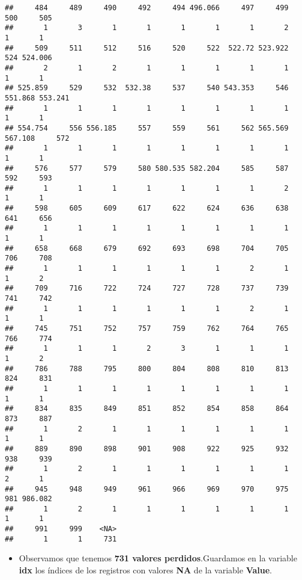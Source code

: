 \documentclass[]{article}
\providecommand{\tightlist}{%
  \setlength{\itemsep}{0pt}\setlength{\parskip}{0pt}}
\begin{document}
\begin{verbatim}
##     484     489     490     492     494 496.066     497     499     500     505 
##       1       3       1       1       1       1       1       2       1       1 
##     509     511     512     516     520     522  522.72 523.922     524 524.006 
##       2       1       2       1       1       1       1       1       1       1 
## 525.859     529     532  532.38     537     540 543.353     546 551.868 553.241 
##       1       1       1       1       1       1       1       1       1       1 
## 554.754     556 556.185     557     559     561     562 565.569 567.108     572 
##       1       1       1       1       1       1       1       1       1       1 
##     576     577     579     580 580.535 582.204     585     587     592     593 
##       1       1       1       1       1       1       1       2       1       1 
##     598     605     609     617     622     624     636     638     641     656 
##       1       1       1       1       1       1       1       1       1       1 
##     658     668     679     692     693     698     704     705     706     708 
##       1       1       1       1       1       1       2       1       1       2 
##     709     716     722     724     727     728     737     739     741     742 
##       1       1       1       1       1       1       2       1       1       1 
##     745     751     752     757     759     762     764     765     766     774 
##       1       1       1       2       3       1       1       1       1       2 
##     786     788     795     800     804     808     810     813     824     831 
##       1       1       1       1       1       1       1       1       1       1 
##     834     835     849     851     852     854     858     864     873     887 
##       1       2       1       1       1       1       1       1       1       1 
##     889     890     898     901     908     922     925     932     938     939 
##       1       2       1       1       1       1       1       1       2       1 
##     945     948     949     961     966     969     970     975     981 986.082 
##       1       2       1       1       1       1       1       1       1       1 
##     991     999    <NA> 
##       1       1     731
\end{verbatim}

\begin{itemize}
\tightlist
\item
  Observamos que tenemos \textbf{731 valores perdidos}.Guardamos en la
  variable \textbf{idx} los índices de los registros con valores
  \textbf{NA} de la variable \textbf{Value}.
\end{itemize}
\end{document}
